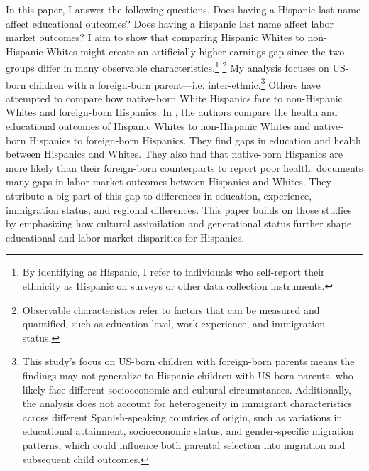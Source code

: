 In this paper, I answer the following questions. Does having a Hispanic last name affect educational outcomes? Does having a Hispanic last name affect labor market outcomes? I aim to show that comparing Hispanic Whites to non-Hispanic Whites might create an artificially higher earnings gap since the two groups differ in many observable characteristics.\footnote{By identifying as Hispanic, I refer to individuals who self-report their ethnicity as Hispanic on surveys or other data collection instruments.} \footnote{Observable characteristics refer to factors that can be measured and quantified, such as education level, work experience, and immigration status.} My analysis focuses on US-born children with a foreign-born parent---i.e. inter-ethnic.\footnote{This study's focus on US-born children with foreign-born parents means the findings may not generalize to Hispanic children with US-born parents, who likely face different socioeconomic and cultural circumstances. Additionally, the analysis does not account for heterogeneity in immigrant characteristics across different Spanish-speaking countries of origin, such as variations in educational attainment, socioeconomic status, and gender-specific migration patterns, which could influence both parental selection into migration and subsequent child outcomes.
} Others have attempted to compare how native-born White Hispanics fare to non-Hispanic Whites and foreign-born Hispanics. In \textcite{antman2020ethnic,antmanEthnicAttritionObserved2016,antmanEthnicAttritionObserved2016a,antmanEthnicAttritionAssimilation2020}, the authors compare the health and educational outcomes of Hispanic Whites to non-Hispanic Whites and native-born Hispanics to foreign-born Hispanics. They find gaps in education and health between Hispanics and Whites. They also find that native-born Hispanics are more likely than their foreign-born counterparts to report poor health. \textcite{davilaChangesRelativeEarnings2008} documents many gaps in labor market outcomes between Hispanics and Whites. They attribute a big part of this gap to differences in education, experience, immigration status, and regional differences. This paper builds on those studies by emphasizing how cultural assimilation and generational status further shape educational and labor market disparities for Hispanics.

